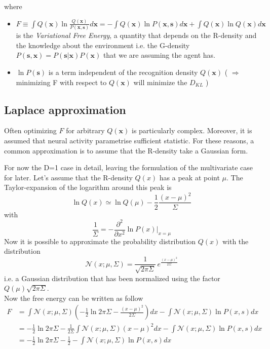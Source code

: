 \documentclass[a4paper, 10pt]{article}
\begin{document}
where
\begin{itemize}

\item $F \equiv \int Q(\mathbf x) \ln \frac{Q(\mathbf x)}{P(\mathbf x,\mathbf s)}d\mathbf x = - \int Q(\mathbf x) \ln P(\mathbf x,\mathbf s) d\mathbf x + \int Q(\mathbf x) \ln Q(\mathbf x) d\mathbf x $ is the \emph{Variational Free Energy}, a quantity that depends on the R-density and the knowledge about the environment i.e. the G-density $P(\mathbf s, \mathbf x) = P(\mathbf s|\mathbf x)P(\mathbf x)$ that we are assuming the agent has. 
\item $\ln P(\mathbf s)$ is a term independent of the recognition density $Q(\mathbf x)$ ( $\Rightarrow$ minimizing F with respect to $Q(\mathbf x)$ will minimize the $D_{KL}$ )

\end{itemize}

\subsection*{Laplace approximation}

Often optimizing $F$ for arbitrary $Q(\mathbf x)$ is particularly complex. Moreover, it is assumed that neural activity parametrise sufficient statistic.
For these reasons, a common approximation is to assume that the R-density take a Gaussian form. 

For now the D=1 case in detail, leaving the formulation of the multivariate case for later.
Let's assume that the R-density $Q(x)$ has a peak at point $\mu$. The Taylor-expansion of the logarithm around this peak is
\begin{equation}
\ln Q(x) \simeq \ln Q(\mu) - \frac{1}{2} \frac{(x-\mu)^2}{\Sigma} 
\end{equation}
with
\begin{equation}
\frac{1}{\Sigma} = - \frac{\partial^{2} }{\partial x^2} \ln P(x) \bigg\rvert_{x=\mu} 
\end{equation}
Now it is possible to approximate the probability distribution $Q(x)$ with the distribution
\begin{equation}
\mathcal{N}(x;\mu, \Sigma) = \frac{1}{\sqrt{ 2 \pi \Sigma}} \, e^{\frac{(x-\mu)^2}{2 \Sigma}}
\end{equation}
i.e. a Gaussian distribution that has been normalized using the factor $Q(\mu) \sqrt{2 \pi \Sigma }$.\\
Now the free energy can be written as follow
\begin{equation}
\begin{split}
F   & = \int \mathcal{N}(x;\mu,\Sigma) (-\frac{1}{2} \ln 2 \pi \Sigma - \frac{(x-\mu)^2}{2 \Sigma} ) d x - \int \mathcal{N}(x;\mu,\Sigma) \ln P(x,s) d x \\
    & = -\frac{1}{2} \ln 2 \pi \Sigma - \frac{1}{2 \Sigma} \int \mathcal{N}(x;\mu,\Sigma) (x-\mu)^2  d x - \int \mathcal{N}(x;\mu,\Sigma) \ln P(x,s) d x \\
    & = -\frac{1}{2} \ln 2 \pi \Sigma - \frac{1}{2} - \int \mathcal{N}(x;\mu,\Sigma) \ln P(x,s) d x
\end{split}
\end{equation}
\end{document}
